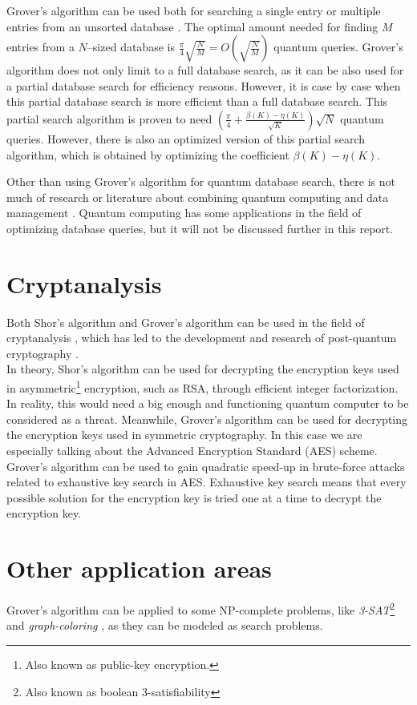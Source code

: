 \documentclass[english,oneside,openright]{UH_DS_report}
\begin{document}
Grover's algorithm can be used both for searching a single entry or multiple entries from an unsorted database \cite{giri2017review}. The optimal amount needed for finding $M$ entries from a $N$--sized database is $\frac{\pi}{4}\sqrt{\frac{N}{M}} = O(\sqrt{\frac{N}{M}})$ quantum queries. Grover's algorithm does not only limit to a full database search, as it can be also used for a partial database search for efficiency reasons. However, it is case by case when this partial database search is more efficient than a full database search. This partial search algorithm is proven to need $(\frac{\pi}{4}+\frac{\beta (K) - \eta (K)}{\sqrt{K}})\sqrt{N}$ quantum queries. However, there is also an optimized version of this partial search algorithm, which is obtained by optimizing the coefficient $\beta (K) - \eta (K)$.

Other than using Grover's algorithm for quantum database search, there is not much of research or literature about combining quantum computing and data management \cite{qcdb}. Quantum computing has some applications in the field of optimizing database queries, but it will not be discussed further in this report.

\section{Cryptanalysis}

Both Shor's algorithm and Grover's algorithm can be used in the field of cryptanalysis \cite{grassl2016applying}, which has led to the development and research of post-quantum cryptography \cite{qcdb}. \\ In theory, Shor's algorithm can be used for decrypting the encryption keys used in asymmetric\footnote{Also known as public-key encryption.} encryption, such as RSA, through efficient integer factorization. In reality, this would need a big enough and functioning quantum computer to be considered as a threat. Meanwhile, Grover's algorithm can be used for decrypting the encryption keys used in symmetric cryptography. In this case we are especially talking about the Advanced Encryption Standard (AES) scheme. Grover's algorithm can be used to gain quadratic speed-up in brute-force attacks related to exhaustive key search in AES. Exhaustive key search means that every possible solution for the encryption key is tried one at a time to decrypt the encryption key.

\section{Other application areas}
Grover's algorithm can be applied to some NP-complete problems, like \emph{3-SAT}\footnote{Also known as boolean 3-satisfiability} \cite{ambainis2004quantum} and \emph{graph-coloring} \cite{introtoqc}, as they can be modeled as search problems.
\end{document}
